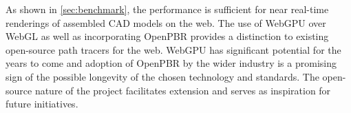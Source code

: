 As shown in \autoref{sec:benchmark}, the performance is sufficient for near real-time renderings of assembled \gls{CAD} models on the web. The use of \gls{WebGPU} over \gls{WebGL} as well as incorporating \gls{OpenPBR} provides a distinction to existing open-source path tracers for the web. \gls{WebGPU} has significant potential for the years to come and adoption of \gls{OpenPBR} by the wider industry is a promising sign of the possible longevity of the chosen technology and standards. The open-source nature of the project facilitates extension and serves as inspiration for future initiatives.
